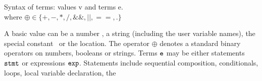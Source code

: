 \documentclass{article}
\begin{document}

%
%
%
\begin{display}{Syntax of terms: values \js v and terms \js e.}
\\
where $\oplus \in \{ +, -, *, /,{\&\&},{||},{==}, . \}$
\end{display}
%
%
A basic value  can be a number , a string  (including the user variable names), 
the special constant \und\
or the \nil location.
%
%
The operator $\oplus$ denotes a standard binary operators on numbers, booleans or strings. 
%
Terms $\mbox{\texttt{{\upshape e}}}$ may be either statements $\mbox{\texttt{{\upshape stmt}}}$ or
expressions $\mbox{\texttt{{\upshape exp}}}$. Statements include sequential composition,
 conditionals, loops, local variable declaration, the
\end{document}
